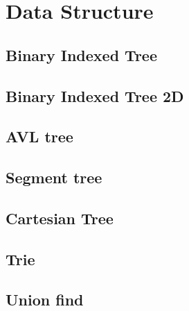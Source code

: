 \newpage
\section{Data Structure}

\subsection{Binary Indexed Tree}


\subsection{Binary Indexed Tree 2D}


\subsection{AVL tree}


\subsection{Segment tree}


\subsection{Cartesian Tree}


\subsection{Trie}


\subsection{Union find}
